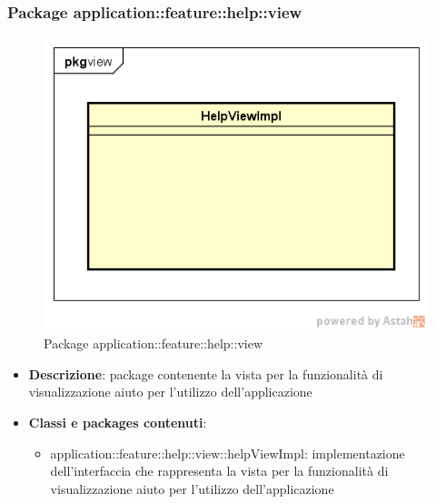 \subsubsection{Package application::feature::help::view}
\label{Package application::feature::help::view}
\begin{figure}[H]
	\centering
	\includegraphics[scale=0.5]{Sezioni/Packages/Application/help_view.png}
	\caption{Package application::feature::help::view}
\end{figure}
\begin{itemize}
	\item \textbf{Descrizione}: package contenente la vista per la funzionalità di visualizzazione aiuto per l'utilizzo dell'applicazione
	\item \textbf{Classi e packages contenuti}:
	\begin{itemize}
	\item application::feature::help::view::helpViewImpl: implementazione dell'interfaccia che rappresenta la vista per la funzionalità di visualizzazione aiuto per l'utilizzo dell'applicazione
	\end{itemize}
\end{itemize}

